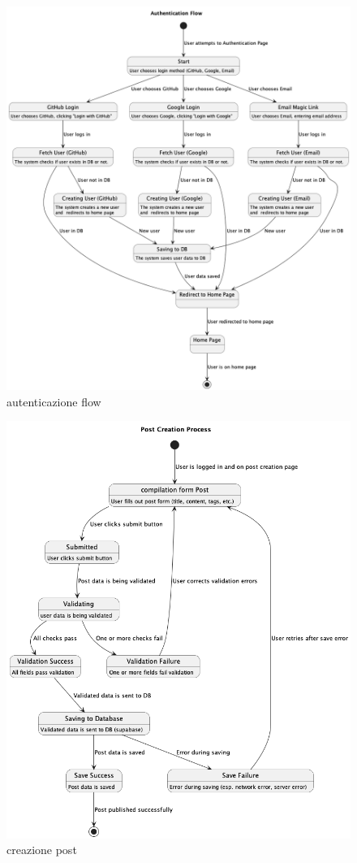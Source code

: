 \documentclass{article}
\begin{document}
\begin{figure}[h]
    \lefting
    \includegraphics[width=1.3\textwidth]{authentication_flow}
    \caption{autenticazione flow}
\end{figure}

\begin{figure}[h]
    \lefting
    \includegraphics[width=1.3\textwidth]{creazione_post_flow}
    \caption{creazione post}
\end{figure}
\end{document}

